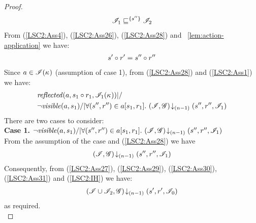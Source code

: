 \begin{lemma}
\begin{proof}
%
\begin{align}
	\mathscr{I}_1 \sqsubseteq^{\{s''\}} \mathscr{I}_2 \label{LSC2:Ass29}
\end{align}
%
From (\ref{LSC2:Ass4}), (\ref{LSC2:Ass26}), (\ref{LSC2:Ass28}) and \lem~\ref{lem:action-application} we have:
%
\begin{align}
	s' \circ r' = s'' \circ r'' \label{LSC2:Ass30}
\end{align}
%
Since $a \in \mathscr{I}(\kappa_{})$ (assumption of case 1), from (\ref{LSC2:Ass28}) and (\ref{LSC2:Ass1}) we have: 
%
\begin{align*}
	& \mathit{reflected}(a, s_1 \circ r_1, \mathscr{I}_1(\kappa_{})) |/\\
	& \neg\mathit{visible}(a, s_1) /| \forall (s'', r'') \in a[s_1, r_1].\, \left(\mathscr{I}, \mathscr{G}\right) \!\downarrow_{(n-1)} \left(s'', r'', \mathscr{I}_1\right) 
\end{align*}
There are two cases to consider:\\
%
\noindent\textbf{Case 1. }
$\neg\mathit{visible}(a, s_1) /| \forall (s'', r'') \in a[s_1, r_1].\, \left(\mathscr{I}, \mathscr{G}\right) \!\downarrow_{(n-1)} \left(s'', r'', \mathscr{I}_1\right)$\\
%
From the assumption of the case and (\ref{LSC2:Ass28}) we have
%
\begin{align}
	\left(\mathscr{I}, \mathscr{G}\right) \!\downarrow_{(n-1)} \left(s'', r'', \mathscr{I}_1\right)
	\label{LSC2:Ass31}
\end{align}
%
Consequently, from (\ref{LSC2:Ass27}), (\ref{LSC2:Ass29}), (\ref{LSC2:Ass30}), (\ref{LSC2:Ass31}) and (\ref{LSC2:IH}) we have: 
%
\begin{align*}
	\left(\mathscr{I} \cup \mathscr{I}_2, \mathscr{G}\right) \!\downarrow_{(n-1)} \left(s', r', \mathscr{I}_0\right)
\end{align*}
%
as required.\\


\end{proof}
\end{lemma}
